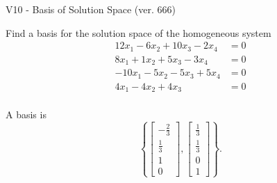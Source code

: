 \begin{exercise}
  \begin{exerciseTitle}V10 - Basis of Solution Space (ver. 666)\end{exerciseTitle}
  \begin{exerciseStatement}
    Find a basis for the solution space of the homogeneous system 
\begin{align*}
 12 x_ 1 -6 x_ 2 + 10 x_ 3 -2 x_ 4 &= 0  \\ 
  8 x_ 1 + 1 x_ 2 + 5 x_ 3 -3 x_ 4 &= 0  \\ 
  -10 x_ 1 -5 x_ 2 -5 x_ 3 + 5 x_ 4 &= 0  \\ 
  4 x_ 1 -4 x_ 2 + 4 x_ 3 &= 0  \\ 
 \end{align*}


 
  \end{exerciseStatement}

  \begin{exerciseAnswer}
   A basis is   
\[\left\{\left[\begin{array}{c}
-\frac{2}{3} \\
\frac{1}{3} \\
1 \\
0
\end{array}\right] , \left[\begin{array}{c}
\frac{1}{3} \\
\frac{1}{3} \\
0 \\
1
\end{array}\right]\right\}.\]

  


  \end{exerciseAnswer}
\end{exercise}